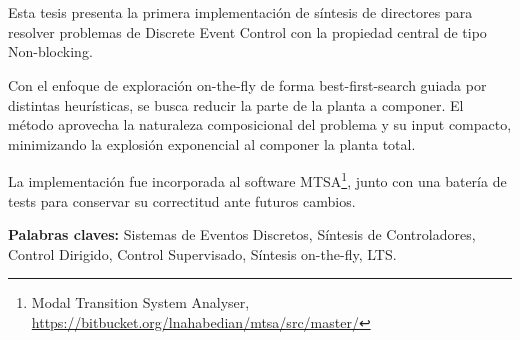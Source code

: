 \chapter*{\runtitulo}

\noindent 

Esta tesis presenta la primera implementación de síntesis de directores para resolver problemas de Discrete Event Control con la propiedad central de tipo Non-blocking.

Con el enfoque de exploración on-the-fly de forma best-first-search guiada por distintas heurísticas, se busca reducir la parte de la planta a componer. El método aprovecha la naturaleza composicional del problema y su input compacto, minimizando la explosión exponencial al componer la planta total.

La implementación fue incorporada al software MTSA\footnote{Modal Transition System Analyser, \href{https://bitbucket.org/lnahabedian/mtsa/src/master/^}{https://bitbucket.org/lnahabedian/mtsa/src/master/}}, junto con una batería de tests para conservar su correctitud ante futuros cambios.
 


%
%

\bigskip

\noindent\textbf{Palabras claves:} Sistemas de Eventos Discretos, Síntesis de Controladores, Control Dirigido, Control Supervisado, Síntesis on-the-fly, LTS.


